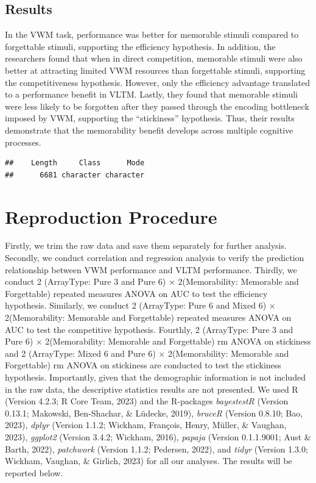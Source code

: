 \documentclass[
  man]{apa6}
\begin{document}
\hypertarget{results}{%
\subsection{Results}\label{results}}

In the VWM task, performance was better for memorable stimuli compared to forgettable stimuli, supporting the efficiency hypothesis.
In addition, the researchers found that when in direct competition, memorable stimuli were also better at attracting limited VWM resources than forgettable stimuli, supporting the competitiveness hypothesis. However, only the efficiency advantage translated to a performance benefit in VLTM.
Lastly, they found that memorable stimuli were less likely to be forgotten after they passed through the encoding bottleneck imposed by VWM, supporting the ``stickiness'' hypothesis.
Thus, their results demonstrate that the memorability benefit develops across multiple cognitive processes.

\begin{verbatim}
##    Length     Class      Mode 
##      6681 character character
\end{verbatim}

\hypertarget{reproduction-procedure}{%
\section{Reproduction Procedure}\label{reproduction-procedure}}

Firstly, we trim the raw data and save them separately for further analysis.
Secondly, we conduct correlation and regression analysis to verify the prediction relationship between VWM performance and VLTM performance.
Thirdly, we conduct 2 (ArrayType: Pure 3 and Pure 6) × 2(Memorability: Memorable and Forgettable) repeated measures ANOVA on AUC to test the efficiency hypothesis. Similarly, we conduct 2 (ArrayType: Pure 6 and Mixed 6) × 2(Memorability: Memorable and Forgettable) repeated measures ANOVA on AUC to test the competitive hypothesis.
Fourthly, 2 (ArrayType: Pure 3 and Pure 6) × 2(Memorability: Memorable and Forgettable) rm ANOVA on stickiness and 2 (ArrayType: Mixed 6 and Pure 6) × 2(Memorability: Memorable and Forgettable) rm ANOVA on stickiness are conducted to test the stickiness hypothesis.
Importantly, given that the demographic information is not included in the raw data, the descriptive statistics results are not presented.
We used R (Version 4.2.3; R Core Team, 2023) and the R-packages \emph{bayestestR} (Version 0.13.1; Makowski, Ben-Shachar, \& Lüdecke, 2019), \emph{bruceR} (Version 0.8.10; Bao, 2023), \emph{dplyr} (Version 1.1.2; Wickham, François, Henry, Müller, \& Vaughan, 2023), \emph{ggplot2} (Version 3.4.2; Wickham, 2016), \emph{papaja} (Version 0.1.1.9001; Aust \& Barth, 2022), \emph{patchwork} (Version 1.1.2; Pedersen, 2022), and \emph{tidyr} (Version 1.3.0; Wickham, Vaughan, \& Girlich, 2023) for all our analyses. The results will be reported below.
\end{document}
